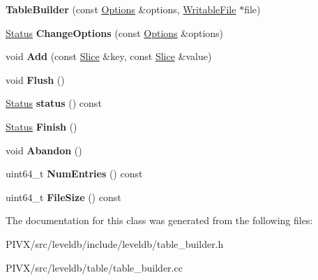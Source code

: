 \begin{DoxyCompactItemize}
\item 
\mbox{\label{classleveldb_1_1_table_builder_a7f5d99e06039848d9b342a4871b31cc6}} 
{\bfseries Table\+Builder} (const \mbox{\hyperlink{structleveldb_1_1_options}{Options}} \&options, \mbox{\hyperlink{classleveldb_1_1_writable_file}{Writable\+File}} $\ast$file)
\item 
\mbox{\label{classleveldb_1_1_table_builder_a6e37a5ddc82161e8665f2fba08031c24}} 
\mbox{\hyperlink{classleveldb_1_1_status}{Status}} {\bfseries Change\+Options} (const \mbox{\hyperlink{structleveldb_1_1_options}{Options}} \&options)
\item 
\mbox{\label{classleveldb_1_1_table_builder_a37bd347cb6340215475ac9b42dc19d10}} 
void {\bfseries Add} (const \mbox{\hyperlink{classleveldb_1_1_slice}{Slice}} \&key, const \mbox{\hyperlink{classleveldb_1_1_slice}{Slice}} \&value)
\item 
\mbox{\label{classleveldb_1_1_table_builder_a544560b4c97cd382ba9b8e0ef69dacfa}} 
void {\bfseries Flush} ()
\item 
\mbox{\label{classleveldb_1_1_table_builder_a9199d15b39f1b7ec83c49b58e8bd4768}} 
\mbox{\hyperlink{classleveldb_1_1_status}{Status}} {\bfseries status} () const
\item 
\mbox{\label{classleveldb_1_1_table_builder_a88f4bae006782e24462362d489dd3f35}} 
\mbox{\hyperlink{classleveldb_1_1_status}{Status}} {\bfseries Finish} ()
\item 
\mbox{\label{classleveldb_1_1_table_builder_a3b4dded079f960b8624bdfa13d967b94}} 
void {\bfseries Abandon} ()
\item 
\mbox{\label{classleveldb_1_1_table_builder_a1449306d91ce2edfd88625482ecd03d1}} 
uint64\+\_\+t {\bfseries Num\+Entries} () const
\item 
\mbox{\label{classleveldb_1_1_table_builder_a50ac83aca1c3321f16f26748d654a6ae}} 
uint64\+\_\+t {\bfseries File\+Size} () const
\end{DoxyCompactItemize}


The documentation for this class was generated from the following files\+:\begin{DoxyCompactItemize}
\item 
P\+I\+V\+X/src/leveldb/include/leveldb/table\+\_\+builder.\+h\item 
P\+I\+V\+X/src/leveldb/table/table\+\_\+builder.\+cc\end{DoxyCompactItemize}
